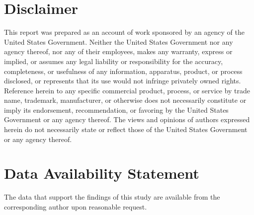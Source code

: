 \documentclass[12pt,prb,aps]{revtex4-1}
\begin{document}
\section*{Disclaimer} This report was prepared as an account of work sponsored by an agency of the United States Government. Neither the United States Government nor any agency thereof, nor any of their employees, makes any warranty, express or implied, or assumes any legal liability or responsibility for the accuracy, completeness, or usefulness of any information, apparatus, product, or process disclosed, or represents that its use would not infringe privately owned rights. Reference herein to any specific commercial product, process, or service by trade name, trademark, manufacturer, or otherwise does not necessarily constitute or imply its endorsement, recommendation, or favoring by the United States Government or any agency thereof. The views and opinions of authors expressed herein do not necessarily state or reflect those of the United States Government or any agency thereof. 
 
\section*{Data Availability Statement}
The data that support the findings of this study are available from the corresponding author upon reasonable request.
 
\end{document}
